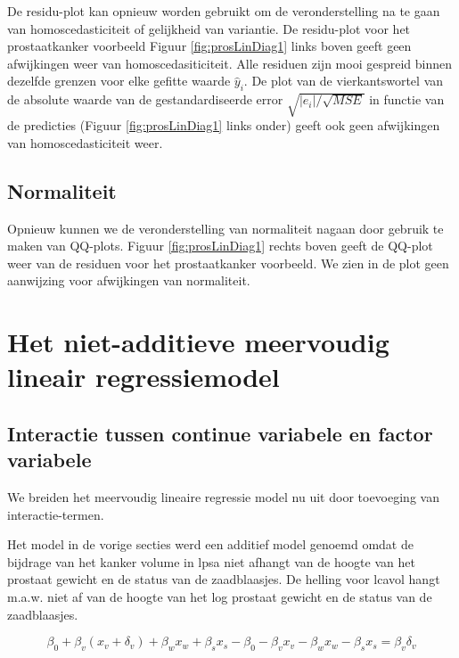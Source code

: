 \documentclass[
  12pt,dutch,coursenotes]{book}
\begin{document}
De residu-plot kan opnieuw worden gebruikt om de veronderstelling na te gaan van homoscedasticiteit of gelijkheid van variantie.
De residu-plot voor het prostaatkanker voorbeeld Figuur \ref{fig:prosLinDiag1} links boven geeft geen afwijkingen weer van homoscedasiticiteit.
Alle residuen zijn mooi gespreid binnen dezelfde grenzen voor elke gefitte waarde \(\hat y_i\).
De plot van de vierkantswortel van de absolute waarde van de gestandardiseerde error \(\sqrt{|e_i|/\sqrt{MSE}}\) in functie van de predicties (Figuur \ref{fig:prosLinDiag1} links onder) geeft ook geen afwijkingen van homoscedasticiteit weer.

\hypertarget{normaliteit}{%
\subsection{Normaliteit}\label{normaliteit}}

Opnieuw kunnen we de veronderstelling van normaliteit nagaan door gebruik te maken van QQ-plots. Figuur \ref{fig:prosLinDiag1} rechts boven geeft de QQ-plot weer van de residuen voor het prostaatkanker voorbeeld. We zien in de plot geen aanwijzing voor afwijkingen van normaliteit.

\hypertarget{het-niet-additieve-meervoudig-lineair-regressiemodel}{%
\section{Het niet-additieve meervoudig lineair regressiemodel}\label{het-niet-additieve-meervoudig-lineair-regressiemodel}}

\hypertarget{interactie-tussen-continue-variabele-en-factor-variabele}{%
\subsection{Interactie tussen continue variabele en factor variabele}\label{interactie-tussen-continue-variabele-en-factor-variabele}}

We breiden het meervoudig lineaire regressie model nu uit door toevoeging van interactie-termen.

Het model in de vorige secties werd een additief model genoemd omdat de bijdrage van het kanker volume in lpsa niet afhangt van de hoogte van het prostaat gewicht en de status van de zaadblaasjes. De helling voor lcavol hangt m.a.w. niet af van de hoogte van het log prostaat gewicht en de status van de zaadblaasjes.

\[
\beta_0 + \beta_v (x_{v}+\delta_v) + \beta_w x_{w} +\beta_s x_{s} - \beta_0 - \beta_v x_{v} - \beta_w x_{w} -\beta_s x_s = \beta_v \delta_v
\]
\end{document}
